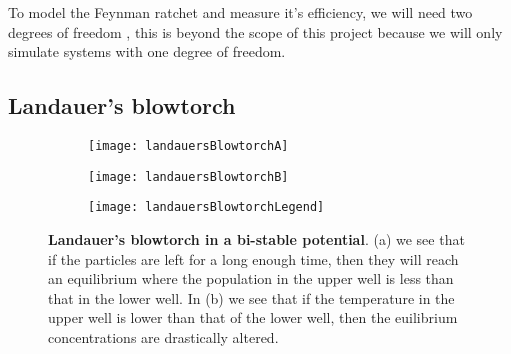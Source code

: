 To model the Feynman ratchet and measure it's efficiency, we will need two degrees of freedom \cite{M.W.Jack2016}, this is beyond the scope of this project because we will only simulate systems with one degree of freedom.

\subsection{Landauer's blowtorch} \label{landauersBlowtorch}
\begin{figure}[tb]
	\begin{subfigure}{0.42\textwidth}
		\texttt{[image: landauersBlowtorchA]}
		\caption{\label{fig:landauerA}}
	\end{subfigure}
	\begin{subfigure}{0.42\textwidth}
		\texttt{[image: landauersBlowtorchB]}
		\caption{\label{fig:landauerB}}
	\end{subfigure}
	\begin{subfigure}{0.12\textwidth}
		\texttt{[image: landauersBlowtorchLegend]}
	\end{subfigure}

\caption{\textbf{Landauer's blowtorch in a bi-stable potential}. (a) we see that if the particles are left for a long enough time, then they will reach an equilibrium where the population in the upper well is less than that in the lower well. In (b) we see that if the temperature in the upper well is lower than that of the lower well, then the euilibrium concentrations are drastically altered.}
\label{fig:landauersBlowtorch}
\end{figure}
